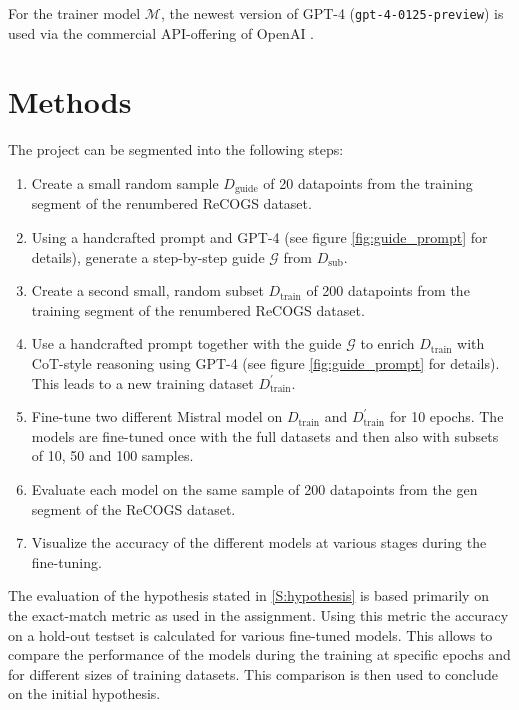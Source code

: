 \documentclass[11pt]{article}
\begin{document}
    For the trainer model $\mathcal{M}$, the newest version of GPT-4 (\texttt{gpt-4-0125-preview}) is used via the
    commercial API-offering of OpenAI \cite{openai_gpt-4_2024}.


    \section{Methods}

    The project can be segmented into the following steps:

    \begin{enumerate}
        \item Create a small random sample $D_\mathrm{guide}$ of 20 datapoints from the training segment of the renumbered ReCOGS dataset.
        \item Using a handcrafted prompt and GPT-4 (see figure \ref{fig:guide_prompt} for details), generate a step-by-step guide $\mathcal{G}$ from $D_\mathrm{sub}$.
        \item Create a second small, random subset $D_\mathrm{train}$ of 200 datapoints from the training segment of the renumbered ReCOGS dataset.
        \item Use a handcrafted prompt together with the guide $\mathcal{G}$ to enrich $D_\mathrm{train}$
        with CoT-style reasoning using GPT-4 (see figure \ref{fig:guide_prompt} for details).
        This leads to a new training dataset $D_\mathrm{train}^\prime$.
        \item Fine-tune two different Mistral model on $D_\mathrm{train}$ and $D_\mathrm{train}^\prime$ for 10 epochs.
        The models are fine-tuned once with the full datasets and then also with subsets of 10, 50 and 100 samples.
        \item Evaluate each model on the same sample of 200 datapoints from the gen segment of the ReCOGS dataset.
        \item Visualize the accuracy of the different models at various stages during the fine-tuning.
    \end{enumerate}


    The evaluation of the hypothesis stated in \ref{S:hypothesis} is based primarily on the exact-match metric as used
    in the assignment.
    Using this metric the accuracy on a hold-out testset is calculated for various fine-tuned models.
    This allows to compare the performance of the models during the training at specific epochs and for different sizes
    of training datasets.
    This comparison is then used to conclude on the initial hypothesis.
\end{document}
